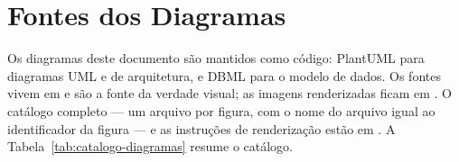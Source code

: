 \chapter{Fontes dos Diagramas}\label{ap:diagramas}

Os diagramas deste documento são mantidos como código: PlantUML para diagramas UML e de arquitetura, e DBML para o modelo de dados. Os fontes vivem em  e são a fonte da verdade visual; as imagens renderizadas ficam em . O catálogo completo --- um arquivo por figura, com o nome do arquivo igual ao identificador da figura --- e as instruções de renderização estão em . A Tabela~\ref{tab:catalogo-diagramas} resume o catálogo.

